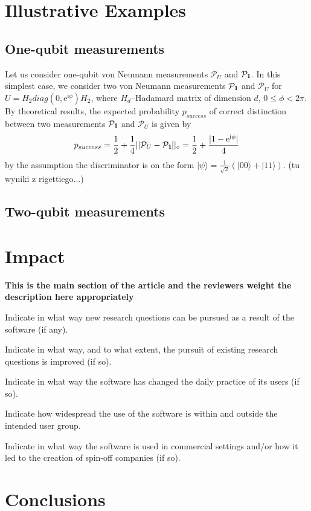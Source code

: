 \documentclass[preprint,12pt, a4paper]{elsarticle}
\newcommand{\ket}[1]{\ensuremath{|#1\rangle}}
\newcommand{\1}{{\rm 1\hspace{-0.9mm}l}}
\newcommand{\Id}{{\rm 1\hspace{-0.9mm}l}}
\newcommand{\ee}{\ensuremath{\mathrm{e}}}
\newcommand{\ii}{\ensuremath{\mathrm{i}}}
\newcommand{\PP}{\mathcal{P}}
\begin{document}
\section{Illustrative Examples}
\subsection{One-qubit measurements}
Let us consider one-qubit von Neumann measurements $\PP_U$ and $\PP_\Id$. In this simplest case,  we consider two von Neumann measurements $\PP_\1$ and $\PP_U$ for $U = H_2 diag(0,\ee^{\ii \phi}) H_2$, where $H_d$--Hadamard matrix of dimension $d$, $0 \le \phi < 2\pi$.    By theoretical results, the expected probability $p_{success}$ of correct distinction between two measurements $\PP_\1$ and $\PP_U$  is given by
\begin{equation}
p_{success} = \frac{1}{2} + \frac{1}{4} ||\PP_U - \PP_\1 ||_\diamond = \frac{1}{2} + \frac{|1-\ee^{\ii \phi}|}{4}
\end{equation}
by the assumption the discriminator is on the form $\ket{\psi} = \frac{1}{\sqrt{2}} ( \ket{00} +  \ket{11} )$. 
(tu wyniki z rigettiego...)




\subsection{Two-qubit measurements}

\section{Impact }


\textbf{This is the main section of the article and the reviewers weight the description here appropriately}

Indicate in what way new research questions can be pursued as a result of the software (if any).

Indicate in what way, and to what extent, the pursuit of existing research questions is improved (if so).

Indicate in what way the software has changed the daily practice of its users (if so).

Indicate how widespread the use of the software is within and outside the intended user group.

Indicate in what way the software is used in commercial settings and/or how it led to the creation of spin-off companies (if so).

\section{Conclusions}
\label{}
\end{document}
